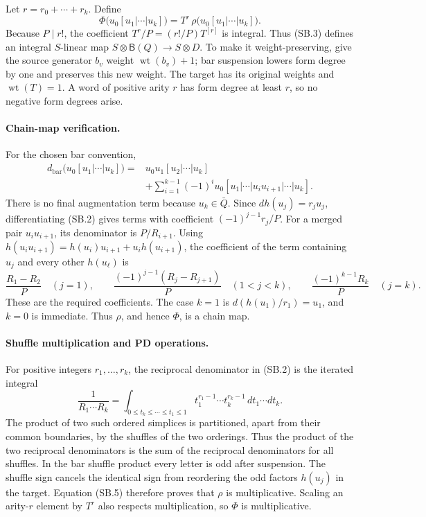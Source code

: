 Let \(r=r_0+\cdots+r_k\). Define
\[
 \Phi\bigl(u_0[u_1|\cdots|u_k]\bigr)=
       T^r\,\rho\bigl(u_0[u_1|\cdots|u_k]\bigr).
 \tag{SB.3}
\]
Because \(P\mid r!\), the coefficient \(T^r/P=(r!/P)T^{[r]}\)
is integral. Thus (SB.3) defines an integral \(S\)-linear map
\(S\otimes\mathsf B(Q)\to S\otimes D\).
To make it weight-preserving, give the source generator \(b_v\) weight
\(\operatorname{wt}(b_v)+1\); bar suspension lowers form degree by
one and preserves this new weight. The target has its original
weights and \(\operatorname{wt}(T)=1\). A word of positive arity \(r\)
has form degree at least \(r\), so no negative form degrees arise.

\paragraph{Chain-map verification.}
For the chosen bar convention,
\[
\begin{split}
 d_{\mathrm{bar}}\bigl(u_0[u_1|\cdots|u_k]\bigr)
  ={}&u_0u_1[u_2|\cdots|u_k]\\
   &+\sum_{i=1}^{k-1}(-1)^i
       u_0[u_1|\cdots|u_i u_{i+1}|\cdots|u_k].
\end{split}
 \tag{SB.4}
\]
There is no final augmentation term because \(u_k\in\bar Q\).
Since \(d h(u_j)=r_j u_j\), differentiating (SB.2) gives terms
with coefficient \((-1)^{j-1}r_j/P\).
For a merged pair \(u_i u_{i+1}\), its denominator is \(P/R_{i+1}\).
Using
\(h(u_i u_{i+1})=h(u_i)u_{i+1}+u_i h(u_{i+1})\),
the coefficient of the term containing \(u_j\) and every other
\(h(u_\ell)\) is
\[
 \frac{R_1-R_2}{P}\quad(j=1),\qquad
 \frac{(-1)^{j-1}(R_j-R_{j+1})}{P}\quad(1<j<k),
 \qquad \frac{(-1)^{k-1}R_k}{P}\quad(j=k).
\]
These are the required coefficients. The case \(k=1\) is
\(d(h(u_1)/r_1)=u_1\), and \(k=0\) is immediate.
Thus \(\rho\), and hence \(\Phi\), is a chain map.

\paragraph{Shuffle multiplication and PD operations.}
For positive integers \(r_1,\ldots,r_k\), the reciprocal denominator
in (SB.2) is the iterated integral
\[
 \frac1{R_1\cdots R_k}
 =
 \int_{0\le t_k\le\cdots\le t_1\le1}
       t_1^{r_1-1}\cdots t_k^{r_k-1}\,dt_1\cdots dt_k.
 \tag{SB.5}
\]
The product of two such ordered simplices is partitioned, apart from
their common boundaries, by the shuffles of the two orderings.
Thus the product of the two reciprocal denominators is the sum of
the reciprocal denominators for all shuffles. In the bar shuffle
product every letter is odd after suspension. The shuffle sign
cancels the identical sign from reordering the odd factors
\(h(u_j)\) in the target. Equation (SB.5) therefore proves that
\(\rho\) is multiplicative. Scaling an arity-\(r\) element by \(T^r\)
also respects multiplication, so \(\Phi\) is multiplicative.

